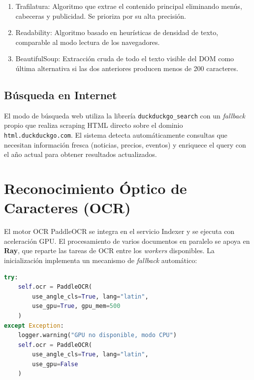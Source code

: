 \begin{enumerate}
    \item Trafilatura: Algoritmo que extrae el contenido principal eliminando menús, cabeceras y publicidad. Se prioriza por su alta precisión.
    \item Readability: Algoritmo basado en heurísticas de densidad de texto, comparable al modo lectura de los navegadores.
    \item BeautifulSoup: Extracción cruda de todo el texto visible del DOM como última alternativa si las dos anteriores producen menos de 200 caracteres.
\end{enumerate}

\subsection{Búsqueda en Internet}

El modo de búsqueda web utiliza la librería \texttt{duckduckgo\_search} con un \textit{fallback} propio que realiza scraping HTML directo sobre el dominio \texttt{html.duckduckgo.com}. El sistema detecta automáticamente consultas que necesitan información fresca (noticias, precios, eventos) y enriquece el query con el año actual para obtener resultados actualizados.

\section{Reconocimiento Óptico de Caracteres (OCR)}
\label{anexo:ocr}

El motor OCR PaddleOCR se integra en el servicio Indexer y se ejecuta con aceleración GPU. El procesamiento de varios documentos en paralelo se apoya en \textbf{Ray}, que reparte las tareas de OCR entre los \textit{workers} disponibles. La inicialización implementa un mecanismo de \textit{fallback} automático:

\begin{lstlisting}[language=Python, caption={Inicialización de PaddleOCR con fallback GPU/CPU.}]
try:
    self.ocr = PaddleOCR(
        use_angle_cls=True, lang="latin",
        use_gpu=True, gpu_mem=500
    )
except Exception:
    logger.warning("GPU no disponible, modo CPU")
    self.ocr = PaddleOCR(
        use_angle_cls=True, lang="latin",
        use_gpu=False
    )
\end{lstlisting}

